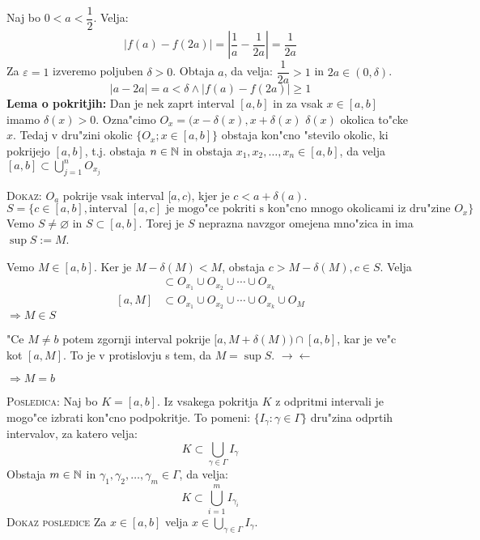 Naj bo $0 < a < \dfrac{1}{2}$. Velja:
\begin{equation*}
|f(a) - f(2a)| = \left|\dfrac{1}{a} - \dfrac{1}{2a}\right| = \dfrac{1}{2a}
\end{equation*}
Za $\varepsilon = 1$ izveremo poljuben $\delta > 0$. Obtaja $a$, da velja: $\dfrac{1}{2a} > 1$ in $2a \in (0, \delta)$.
\begin{equation*}
|a - 2a| = a < \delta \land |f(a) - f(2a)| \geq 1
\end{equation*}
\textbf{Lema o pokritjih:} Dan je nek zaprt interval $[a, b]$ in za vsak $x \in [a, b]$ imamo $\delta(x) > 0$. Ozna"cimo $O_x = (x - \delta(x), x + \delta(x)$ $\delta(x)$ okolica to"cke $x$. Tedaj v dru"zini okolic $\{O_x; x \in [a, b]\}$ obstaja kon"cno "stevilo okolic, ki pokrijejo $[a, b]$, t.j. obstaja $n \in \mathbb{N}$ in obstaja $x_1, x_2, \ldots, x_n \in [a, b]$, da velja $[a, b] \subset \bigcup_{j=1}^n O_{x_j}$

\textsc{Dokaz:} $O_a$ pokrije vsak interval $[a, c)$, kjer je $c < a + \delta(a)$.
\begin{equation*}
S = \{c \in [a, b], \text{interval $[a, c]$ je mogo"ce pokriti s kon"cno mnogo okolicami iz dru"zine $O_x$}\}
\end{equation*}
Vemo $S \neq \varnothing$ in $S \subset [a, b]$. Torej je $S$ neprazna navzgor omejena mno"zica in ima $\sup S := M$.


Vemo $M \in [a, b]$. Ker je $M - \delta(M) < M$, obstaja $c > M - \delta(M), c \in S$. Velja
\begin{align*}
[a, c] & \subset O_{x_1} \cup O_{x_2} \cup \cdots \cup O_{x_k} \\
[a, M] & \subset O_{x_1} \cup O_{x_2} \cup \cdots \cup O_{x_k} \cup O_M
\end{align*}
$\Rightarrow M \in S$

"Ce $M \neq b$ potem zgornji interval pokrije $[a, M + \delta(M)) \cap [a, b]$, kar je ve"c kot $[a, M]$. To je v protislovju s tem, da $M = \sup S$. $\rightarrow \leftarrow$

$\Rightarrow M = b$

\textsc{Posledica:} Naj bo $K = [a, b]$. Iz vsakega pokritja $K$ z odpritmi intervali je mogo"ce izbrati kon"cno podpokritje. To pomeni: $\{I_\gamma: \gamma \in \Gamma\}$ dru"zina odprtih intervalov, za katero velja:
\begin{equation*}
K \subset \bigcup_{\gamma \in \Gamma} I_\gamma
\end{equation*}
Obstaja $m \in \mathbb{N}$ in $\gamma_1, \gamma_2, \ldots, \gamma_m \in \Gamma$, da velja:
\begin{equation*}
K \subset \bigcup_{i = 1}^m I_{\gamma_i}
\end{equation*}
\textsc{Dokaz posledice}
Za $x \in [a, b]$ velja $x \in \bigcup_{\gamma \in \Gamma} I_\gamma$.

